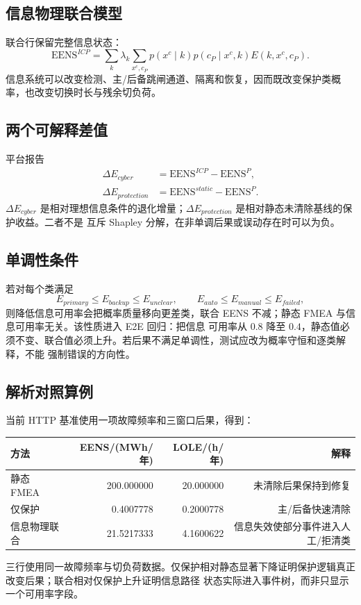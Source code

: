 \subsection{信息物理联合模型}
联合行保留完整信息状态：
\begin{equation}
 \mathrm{EENS}^{ICP}=\sum_k\lambda_k\sum_{x^c,c_P}
 p(x^c\mid k)p(c_P\mid x^c,k)E(k,x^c,c_P).
\end{equation}
信息系统可以改变检测、主/后备跳闸通道、隔离和恢复，因而既改变保护类概率，也改变切换时长与残余切负荷。

\subsection{两个可解释差值}
平台报告
\begin{align}
 \Delta E_{cyber}&=\mathrm{EENS}^{ICP}-\mathrm{EENS}^{P},\\
 \Delta E_{protection}&=\mathrm{EENS}^{static}-\mathrm{EENS}^{P}.
\end{align}
$\Delta E_{cyber}$ 是相对理想信息条件的退化增量；$\Delta E_{protection}$ 是相对静态未清除基线的保护收益。二者不是
互斥 Shapley 分解，在非单调后果或误动存在时可以为负。

\subsection{单调性条件}
若对每个类满足
\begin{equation}
 E_{primary}\le E_{backup}\le E_{unclear},\qquad
 E_{auto}\le E_{manual}\le E_{failed},
\end{equation}
则降低信息可用率会把概率质量移向更差类，联合 EENS 不减；静态 FMEA 与信息可用率无关。该性质进入 E2E 回归：把信息
可用率从 $0.8$ 降至 $0.4$，静态值必须不变、联合值必须上升。若后果不满足单调性，测试应改为概率守恒和逐类解释，不能
强制错误的方向性。

\subsection{解析对照算例}
当前 HTTP 基准使用一项故障频率和三窗口后果，得到：
\begin{center}
\begin{tabular}{@{}lrrr@{}}
\toprule
方法 & EENS/(MWh/年) & LOLE/(h/年) & 解释\\
\midrule
静态 FMEA & 200.000000 & 20.000000 & 未清除后果保持到修复\\
仅保护 & 0.4007778 & 0.2000778 & 主/后备快速清除\\
信息物理联合 & 21.5217333 & 4.1600622 & 信息失效使部分事件进入人工/拒清类\\
\bottomrule
\end{tabular}
\end{center}
三行使用同一故障频率与切负荷数据。仅保护相对静态显著下降证明保护逻辑真正改变后果；联合相对仅保护上升证明信息路径
状态实际进入事件树，而非只显示一个可用率字段。

